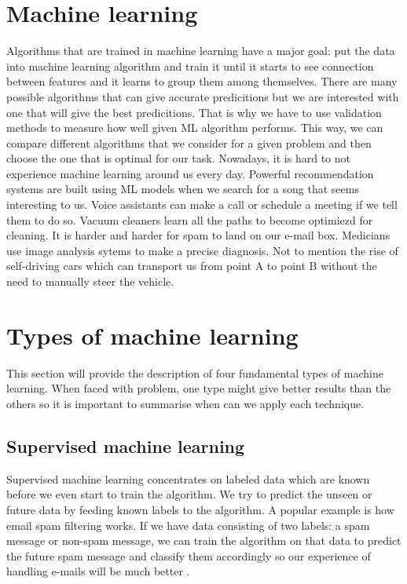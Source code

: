 \documentclass[a4paper,oneside,openright,11pt]{book}
\begin{document}
\section{Machine learning}

Algorithms that are trained in machine learning have a major goal: 
put the data into machine learning algorithm and train it until it starts to see connection between features and it learns to group them among themselves. There are many possible algorithms that can give accurate predicitions but we are interested with one that will give the best predicitions. That is why we have to use validation methods to measure how well given ML algorithm performs. This way, we can compare different algorithms that we consider for a given problem and then choose the one that is optimal for our task. Nowadays, it is hard to not experience machine learning around us every day. Powerful recommendation systems are built using ML models when we search for a song that seems interesting to us. Voice assistants can make a call or schedule a meeting if we tell them to do so. Vacuum cleaners learn all the paths to become optimiezd for cleaning. It is harder and harder for spam to land on our e-mail box. Medicians use image analysis sytems to make a precise diagnosis. Not to mention the rise of self-driving cars which can transport us from point A to point B without the need to manually steer the vehicle. 


\section{Types of machine learning}

This section will provide the description of four fundamental types of machine learning. When faced with problem, one type might give better results than the others so it is important to summarise when can we apply each technique. 


\subsection{Supervised machine learning}

Supervised machine learning concentrates on labeled data which are known before we even start to train the algorithm. We try to predict the unseen or future data by feeding known labels to the algorithm. A popular example is how email spam filtering works. If we have data consisting of two labels: a spam message or non-spam message, we can train the algorithm on that data to predict the future spam message and classify them accordingly so our experience of handling e-mails will be much better \cite{raschka}\cite{aurelion}.  
\end{document}
